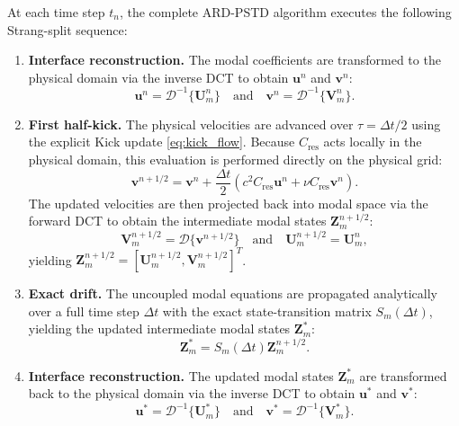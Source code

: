 \documentclass{Configuration_Files/PoliMi3i_thesis}
\begin{document}
At each time step $t_n$, the complete ARD-PSTD algorithm executes the following Strang-split sequence:

\begin{enumerate}

\item
\textbf{Interface reconstruction.}
The modal coefficients are transformed to the physical domain via the inverse DCT to obtain $\mathbf u^n$ and $\mathbf v^n$:
\begin{equation*}
    \mathbf{u}^n = \mathcal{D}^{-1} \{ \mathbf{U}_m^n \} \quad \text{and} \quad \mathbf{v}^n = \mathcal{D}^{-1} \{ \mathbf{V}_m^n \}.
\end{equation*}

\item
\textbf{First half-kick.}
The physical velocities are advanced over $\tau = \Delta t/2$ using the explicit Kick update \eqref{eq:kick_flow}. Because $C_{\mathrm{res}}$ acts locally in the physical domain, this evaluation is performed directly on the physical grid:
\begin{equation*}
    \mathbf{v}^{n+1/2} = \mathbf{v}^n + \frac{\Delta t}{2} \left( c^2 C_{\mathrm{res}} \mathbf{u}^n + \nu C_{\mathrm{res}} \mathbf{v}^n \right).
\end{equation*}
The updated velocities are then projected back into modal space via the forward DCT to obtain the intermediate modal states $\mathbf Z_m^{n+1/2}$:
\begin{equation*}
    \mathbf{V}_m^{n+1/2} = \mathcal{D} \{ \mathbf{v}^{n+1/2} \} \quad \text{and} \quad \mathbf{U}_m^{n+1/2} = \mathbf{U}_m^n,
\end{equation*}
yielding $\mathbf{Z}_m^{n+1/2} = [\mathbf{U}_m^{n+1/2}, \mathbf{V}_m^{n+1/2}]^T$.

\item
\textbf{Exact drift.}
The uncoupled modal equations are propagated analytically over a full time step $\Delta t$ with the exact state-transition matrix $S_m(\Delta t)$, yielding the updated intermediate modal states $\mathbf Z_m^*$:
\begin{equation*}
    \mathbf{Z}_m^* = S_m(\Delta t) \mathbf{Z}_m^{n+1/2}.
\end{equation*}

\item
\textbf{Interface reconstruction.}
The updated modal states $\mathbf Z_m^*$ are transformed back to the physical domain via the inverse DCT to obtain $\mathbf u^*$ and $\mathbf v^*$:
\begin{equation*}
    \mathbf{u}^* = \mathcal{D}^{-1} \{ \mathbf{U}_m^* \} \quad \text{and} \quad \mathbf{v}^* = \mathcal{D}^{-1} \{ \mathbf{V}_m^* \}.
\end{equation*}


\end{enumerate}
\end{document}
